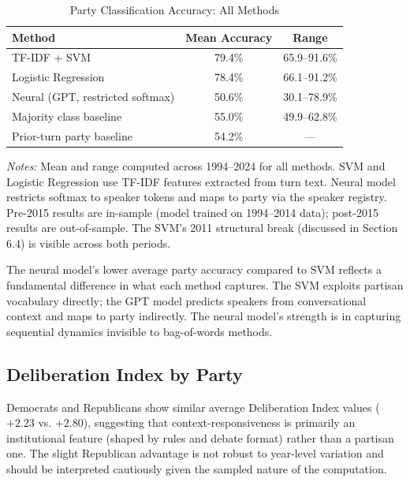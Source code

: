 \documentclass[12pt]{article}
\begin{document}
\begin{table}[H]
\centering
\caption{Party Classification Accuracy: All Methods}
\label{tab:baselines}
\begin{threeparttable}
\begin{tabular}{lcc}
\toprule
Method & Mean Accuracy & Range \\
\midrule
TF-IDF + SVM & 79.4\% & 65.9--91.6\% \\
Logistic Regression & 78.4\% & 66.1--91.2\% \\
Neural (GPT, restricted softmax) & 50.6\% & 30.1--78.9\% \\
Majority class baseline & 55.0\% & 49.9--62.8\% \\
Prior-turn party baseline & 54.2\% & --- \\
\bottomrule
\end{tabular}
\begin{tablenotes}[flushleft]
\small
\item \textit{Notes:} Mean and range computed across 1994--2024 for all methods. SVM and Logistic Regression use TF-IDF features extracted from turn text. Neural model restricts softmax to speaker tokens and maps to party via the speaker registry. Pre-2015 results are in-sample (model trained on 1994--2014 data); post-2015 results are out-of-sample. The SVM's 2011 structural break (discussed in Section 6.4) is visible across both periods.
\end{tablenotes}
\end{threeparttable}
\end{table}

The neural model's lower average party accuracy compared to SVM reflects a fundamental difference in what each method captures. The SVM exploits partisan vocabulary directly; the GPT model predicts speakers from conversational context and maps to party indirectly. The neural model's strength is in capturing sequential dynamics invisible to bag-of-words methods.

\subsection{Deliberation Index by Party}

Democrats and Republicans show similar average Deliberation Index values ($+2.23$ vs. $+2.80$), suggesting that context-responsiveness is primarily an institutional feature (shaped by rules and debate format) rather than a partisan one. The slight Republican advantage is not robust to year-level variation and should be interpreted cautiously given the sampled nature of the computation.
\end{document}
